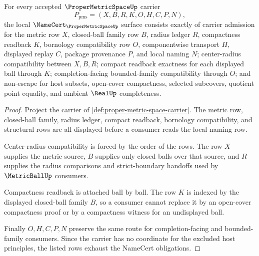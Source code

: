 \begin{theorem}
\label{thm:proper-metric-space-namecert-obligations}
For every accepted $\ProperMetricSpaceUp$ carrier
$$
P_{\mathrm{pms}}=(X,B,R,K,O,H,C,P,N),
$$
the local $\NameCert_{\ProperMetricSpaceUp}$ surface consists exactly of carrier admission for the metric row $X$, closed-ball family row $B$, radius ledger $R$, compactness readback $K$, bornology compatibility row $O$, componentwise transport $H$, displayed replay $C$, package provenance $P$, and local naming $N$; center-radius compatibility between $X,B,R$; compact readback exactness for each displayed ball through $K$; completion-facing bounded-family compatibility through $O$; and non-escape for host subsets, open-cover compactness, selected subcovers, quotient point equality, and ambient $\RealUp$ completeness.
\end{theorem}
\begin{proof}
Project the carrier of \autoref{def:proper-metric-space-carrier}. The metric row, closed-ball family, radius ledger, compact readback, bornology compatibility, and structural rows are all displayed before a consumer reads the local naming row.

Center-radius compatibility is forced by the order of the rows. The row $X$ supplies the metric source, $B$ supplies only closed balls over that source, and $R$ supplies the radius comparisons and strict-boundary handoffs used by $\MetricBallUp$ consumers.

Compactness readback is attached ball by ball. The row $K$ is indexed by the displayed closed-ball family $B$, so a consumer cannot replace it by an open-cover compactness proof or by a compactness witness for an undisplayed ball.

Finally $O,H,C,P,N$ preserve the same route for completion-facing and bounded-family consumers. Since the carrier has no coordinate for the excluded host principles, the listed rows exhaust the NameCert obligations.
\end{proof}

